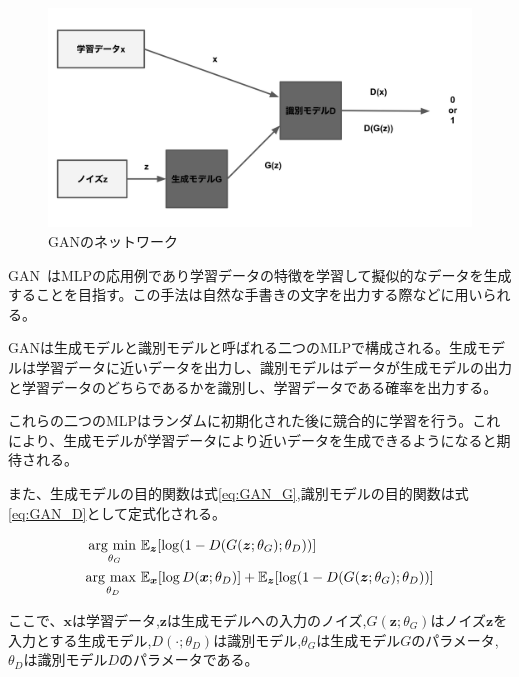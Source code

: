 \begin{figure}[t]
\begin{center}
\includegraphics[width=\hsize]{figure/GAN_net.png}
\caption{GANのネットワーク}
\label{fig:GAN_net}
\end{center}
\end{figure}


GAN~\cite{GAN}はMLPの応用例であり学習データの特徴を学習して擬似的なデータを生成することを目指す。この手法は自然な手書きの文字を出力する際などに用いられる。

GANは生成モデルと識別モデルと呼ばれる二つのMLPで構成される。生成モデルは学習データに近いデータを出力し、識別モデルはデータが生成モデルの出力と学習データのどちらであるかを識別し、学習データである確率を出力する。

これらの二つのMLPはランダムに初期化された後に競合的に学習を行う。これにより、生成モデルが学習データにより近いデータを生成できるようになると期待される。

また、生成モデルの目的関数は式\ref{eq:GAN_G},識別モデルの目的関数は式\ref{eq:GAN_D}として定式化される。

\begin{align}
    \label{eq:GAN_G}
    \mathop{\rm arg~min~}\limits _{\theta_G}& \mathbb{E}_{\boldsymbol{z}}[\log (1-D(G(\boldsymbol{z};\theta_G);\theta_D))]\\
    \label{eq:GAN_D}
    \mathop{\rm arg~max~}\limits _{\theta_D}& \mathbb{E}_{\boldsymbol{x}}[\log D(\boldsymbol{x};\theta_D)]+\mathbb{E}_{\boldsymbol{z}}[\log (1-D(G(\boldsymbol{z};\theta_G);\theta_D))]
\end{align}

ここで、$\boldsymbol{x}$は学習データ,$\boldsymbol{z}$は生成モデルへの入力のノイズ,$G(\boldsymbol{z};\theta_G)$はノイズ$\boldsymbol{z}$を入力とする生成モデル,$D(\cdot;\theta_D)$は識別モデル,$\theta_G$は生成モデル$G$のパラメータ,$\theta_D$は識別モデル$D$のパラメータである。



